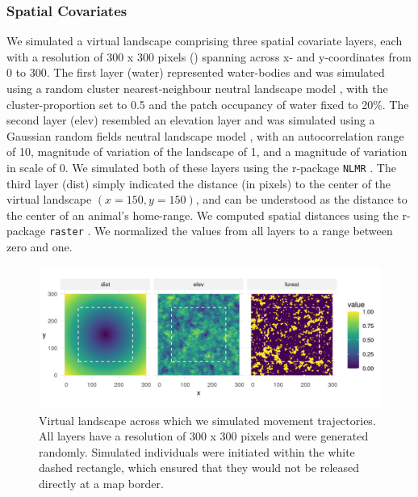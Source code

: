 \documentclass[abstract=on,10pt,a4paper,bibliography=totocnumbered]{article}
\begin{document}
\subsubsection{Spatial Covariates}
We simulated a virtual landscape comprising three spatial covariate layers, each
with a resolution of 300 x 300 pixels () spanning across x- and
y-coordinates from 0 to 300. The first layer (\textsf{water}) represented
water-bodies and was simulated using a random cluster nearest‐neighbour neutral
landscape model \citep{Saura.2000}, with the cluster-proportion set to 0.5 and
the patch occupancy of water fixed to 20\%. The second layer (\textsf{elev})
resembled an elevation layer and was simulated using a Gaussian random fields
neutral landscape model \citep{Schlather.2015}, with an autocorrelation range of
10, magnitude of variation of the landscape of 1, and a magnitude of variation
in scale of 0. We simulated both of these layers using the r-package {\tt NLMR}
\citep{Sciaini.2018}. The third layer (\textsf{dist}) simply indicated the
distance (in pixels) to the center of the virtual landscape \((x = 150, y =
150)\), and can be understood as the distance to the center of an animal's
home-range. We computed spatial distances using the r-package {\tt raster}
\citep{Hijmans.2022}. We normalized the values from all layers to a range
between zero and one.

\begin{figure}
  \begin{center}
  \includegraphics[width = \textwidth]{99_Covariates.png}
  \caption{Virtual landscape across which we simulated movement trajectories.
  All layers have a resolution of 300 x 300 pixels and were generated randomly.
  Simulated individuals were initiated within the white dashed rectangle, which
  ensured that they would not be released directly at a map border.}
  \label{Covariates}
  \end{center}
\end{figure}
\end{document}
